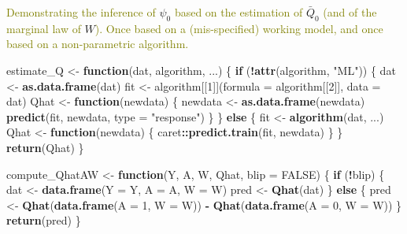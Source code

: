 \documentclass[]{article}
\newenvironment{Shaded}{\begin{snugshade}}{\end{snugshade}}
\newcommand{\ControlFlowTok}[1]{\textcolor[rgb]{0.13,0.29,0.53}{\textbf{#1}}}
\newcommand{\DataTypeTok}[1]{\textcolor[rgb]{0.13,0.29,0.53}{#1}}
\newcommand{\DecValTok}[1]{\textcolor[rgb]{0.00,0.00,0.81}{#1}}
\newcommand{\KeywordTok}[1]{\textcolor[rgb]{0.13,0.29,0.53}{\textbf{#1}}}
\newcommand{\NormalTok}[1]{#1}
\newcommand{\OperatorTok}[1]{\textcolor[rgb]{0.81,0.36,0.00}{\textbf{#1}}}
\newcommand{\OtherTok}[1]{\textcolor[rgb]{0.56,0.35,0.01}{#1}}
\newcommand{\StringTok}[1]{\textcolor[rgb]{0.31,0.60,0.02}{#1}}
\newcommand{\Qbar}{\bar{Q}}
\newcommand{\tcg}[1]{\textcolor{olive}{#1}}
\theoremstyle{definition}
\theoremstyle{definition}
\theoremstyle{definition}
\theoremstyle{remark}
\begin{document}
\tcg{Demonstrating the  inference of} \(\psi_{0}\)
\tcg{based  on the estimation
of} \(\Qbar_{0}\) \tcg{(and of the marginal  law of}
\(W\)\tcg{).  Once based on a
(mis-specified) working model, and once based on a non-parametric algorithm.}

\begin{Shaded}
\begin{Highlighting}[]
\NormalTok{estimate_Q <-}\StringTok{ }\ControlFlowTok{function}\NormalTok{(dat, algorithm, ...) \{}
  \ControlFlowTok{if}\NormalTok{ (}\OperatorTok{!}\KeywordTok{attr}\NormalTok{(algorithm, }\StringTok{"ML"}\NormalTok{)) \{}
\NormalTok{    dat <-}\StringTok{ }\KeywordTok{as.data.frame}\NormalTok{(dat)}
\NormalTok{    fit <-}\StringTok{ }\NormalTok{algorithm[[}\DecValTok{1}\NormalTok{]](}\DataTypeTok{formula =}\NormalTok{ algorithm[[}\DecValTok{2}\NormalTok{]], }\DataTypeTok{data =}\NormalTok{ dat)}
\NormalTok{    Qhat <-}\StringTok{ }\ControlFlowTok{function}\NormalTok{(newdata) \{}
\NormalTok{      newdata <-}\StringTok{ }\KeywordTok{as.data.frame}\NormalTok{(newdata)}
      \KeywordTok{predict}\NormalTok{(fit, newdata, }\DataTypeTok{type =} \StringTok{"response"}\NormalTok{)}
\NormalTok{    \}}
\NormalTok{  \} }\ControlFlowTok{else}\NormalTok{ \{}
\NormalTok{    fit <-}\StringTok{ }\KeywordTok{algorithm}\NormalTok{(dat, ...)}
\NormalTok{    Qhat <-}\StringTok{ }\ControlFlowTok{function}\NormalTok{(newdata) \{}
\NormalTok{      caret}\OperatorTok{::}\KeywordTok{predict.train}\NormalTok{(fit, newdata)}
\NormalTok{    \}    }
\NormalTok{  \}}
  \KeywordTok{return}\NormalTok{(Qhat)}
\NormalTok{\}}

\NormalTok{compute_QhatAW <-}\StringTok{ }\ControlFlowTok{function}\NormalTok{(Y, A, W, Qhat, }\DataTypeTok{blip =} \OtherTok{FALSE}\NormalTok{) \{}
  \ControlFlowTok{if}\NormalTok{ (}\OperatorTok{!}\NormalTok{blip) \{}
\NormalTok{    dat <-}\StringTok{ }\KeywordTok{data.frame}\NormalTok{(}\DataTypeTok{Y =}\NormalTok{ Y, }\DataTypeTok{A =}\NormalTok{ A, }\DataTypeTok{W =}\NormalTok{ W)}
\NormalTok{    pred <-}\StringTok{ }\KeywordTok{Qhat}\NormalTok{(dat)}
\NormalTok{  \} }\ControlFlowTok{else}\NormalTok{ \{}
\NormalTok{    pred <-}\StringTok{ }\KeywordTok{Qhat}\NormalTok{(}\KeywordTok{data.frame}\NormalTok{(}\DataTypeTok{A =} \DecValTok{1}\NormalTok{, }\DataTypeTok{W =}\NormalTok{ W)) }\OperatorTok{-}\StringTok{ }\KeywordTok{Qhat}\NormalTok{(}\KeywordTok{data.frame}\NormalTok{(}\DataTypeTok{A =} \DecValTok{0}\NormalTok{, }\DataTypeTok{W =}\NormalTok{ W))}
\NormalTok{  \}}
  \KeywordTok{return}\NormalTok{(pred)  }
\NormalTok{\}}


\end{Highlighting}
\end{Shaded}
\end{document}
